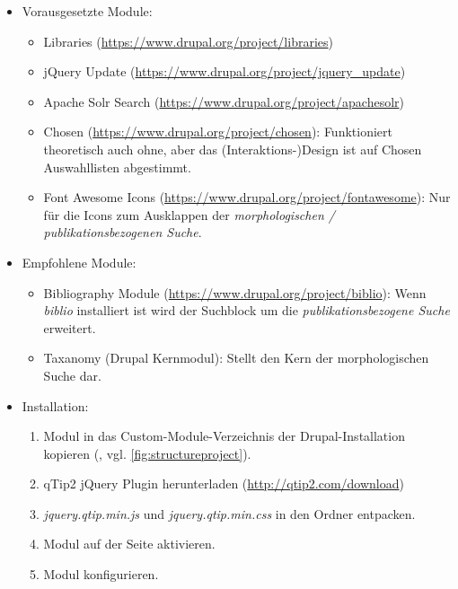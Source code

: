 \begin{itemize}[parsep=0pt, itemsep=5.0pt plus 2.0pt minus 1.0pt, leftmargin=*]
	\item Vorausgesetzte Module:
	\begin{itemize}
		\item Libraries (\url{https://www.drupal.org/project/libraries})
		\item jQuery Update (\url{https://www.drupal.org/project/jquery_update})
		\item Apache Solr Search (\url{https://www.drupal.org/project/apachesolr})
		\item Chosen (\url{https://www.drupal.org/project/chosen}): Funktioniert theoretisch auch ohne, aber das (Interaktions-)Design ist auf Chosen Auswahllisten abgestimmt.  
		\item Font Awesome Icons (\url{https://www.drupal.org/project/fontawesome}): Nur für die Icons zum Ausklappen der \textit{morphologischen / publikationsbezogenen Suche}.
	\end{itemize}
	
	\item Empfohlene Module:
	\begin{itemize}
		\item Bibliography Module (\url{https://www.drupal.org/project/biblio}): Wenn \textit{biblio} installiert ist wird der Suchblock um die \textit{publikationsbezogene Suche} erweitert.
		\item Taxanomy (Drupal Kernmodul): Stellt den Kern der morphologischen Suche dar.
	\end{itemize}

	\item Installation: 
	\begin{enumerate}
		\item Modul in das Custom-Module-Verzeichnis der Drupal-Installation kopieren  (\zB {}, vgl. \cref{fig:structureproject}).
		\item qTip2 jQuery Plugin herunterladen (\url{http://qtip2.com/download}) 
		\item \textit{jquery.qtip.min.js} und \textit{jquery.qtip.min.css} in den Ordner  entpacken.
		\item Modul auf der Seite  aktivieren.
		\item Modul konfigurieren.
		
	\end{enumerate}
	

\end{itemize}
